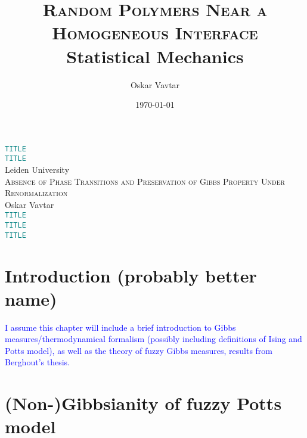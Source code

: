 \documentclass[12pt]{article}
\title{\textsc{Random Polymers Near a Homogeneous Interface}\\\vspace{0.3cm}\small{Statistical Mechanics}\vspace{-0.7cm}}
\author{Oskar Vavtar}
\date{\today}
\newcommand{\1}{\mathbbm{1}}
\newcommand{\5}{\vspace{0.5cm}}
\theoremstyle{definition}
\begin{document}
\begin{center}
\Huge{\textcolor{teal}{\texttt{TITLE}}} \\
\vspace{2cm}
\Huge{\textcolor{teal}{\texttt{TITLE}}} \\
\vspace{2cm}
Leiden University \\
\vspace{2cm}
{\textsc{Absence of Phase Transitions and Preservation of Gibbs Property Under Renormalization}} \\
\vspace{2cm}
Oskar Vavtar \\
\vspace{2cm}
\Huge{\textcolor{teal}{\texttt{TITLE}}} \\
\vspace{2cm}
\Huge{\textcolor{teal}{\texttt{TITLE}}} \\
\vspace{2cm}
\Huge{\textcolor{teal}{\texttt{TITLE}}}
\end{center}
\pagebreak
\tableofcontents
\pagebreak


\section{Introduction (probably better name)}

\textcolor{blue}{I assume this chapter will include a brief introduction to Gibbs measures/thermodynamical formalism (possibly including definitions of Ising and Potts model), as well as the theory of fuzzy Gibbs measures, results from Berghout's thesis.} 

\pagebreak


\section{(Non-)Gibbsianity of fuzzy Potts model}
\end{document}

